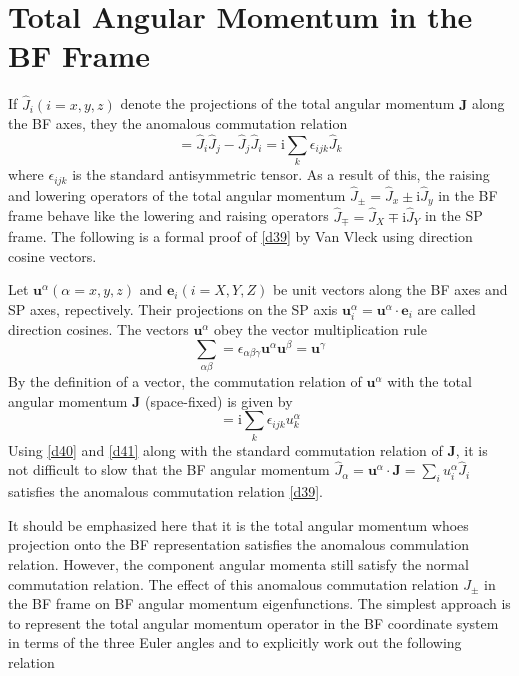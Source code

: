 \documentclass[]{article}
\begin{document}
\section{Total Angular Momentum in the BF Frame}
If $\hat{J}_i(i=x,y,z)$ denote the projections of the total angular momentum $\mathbf{J}$ along the BF axes, they the anomalous commutation relation
\begin{equation}
	[\hat{J}_i,\hat{J}_j]=\hat{J}_i\hat{J}_j-\hat{J}_j\hat{J}_i=\mathrm{i}\sum\limits_k\epsilon_{ijk}\hat{J}_k
	\label{d39}
\end{equation}
where $\epsilon_{ijk}$ is the standard antisymmetric tensor. As a result of this, the raising and lowering operators of the total angular momentum $\hat{J}_\pm=\hat{J}_x\pm\mathrm{i}\hat{J}_y$ in the BF frame behave like the lowering and raising operators $\hat{J}_\mp=\hat{J}_X\mp\mathrm{i}\hat{J}_Y$ in the SP frame. The following is a formal proof of \eqref{d39} by Van Vleck using direction cosine vectors.\par 
Let $\mathbf{u}^\alpha(\alpha=x,y,z)$ and $\mathbf{e}_i(i=X,Y,Z)$ be unit vectors along the BF axes and SP axes, repectively. Their projections on the SP axis $\mathbf{u}^\alpha_i=\mathbf{u}^\alpha\cdot\mathbf{e}_i$ are called direction cosines. The vectors $\mathbf{u}^\alpha$ obey the vector multiplication rule
\begin{equation}
	\sum\limits_{\alpha\beta}=\epsilon_{\alpha\beta\gamma}\mathbf{u}^\alpha\mathbf{u}^\beta=\mathbf{u}^\gamma 
	\label{d40}
\end{equation}
By the definition of a vector, the commutation relation of $\mathbf{u}^\alpha$ with the total angular momentum $\mathbf{J}$ (space-fixed) is given by
\begin{equation}
	[\hat{J}_i,u^\alpha_j] =\mathrm{i}\sum\limits_k\epsilon_{ijk}u^\alpha_k 
	\label{d41}
\end{equation}
Using \eqref{d40} and \eqref{d41} along with the standard commutation relation of $\mathbf{J}$, it is not difficult to slow that the BF angular momentum $\hat{J}_\alpha=\mathbf{u}^\alpha\cdot\mathbf{J}=\sum_iu^\alpha_i\hat{J}_i$ satisfies the anomalous commutation relation \eqref{d39}.\par 
It should be emphasized here that it is the total angular momentum whoes projection onto the BF representation satisfies the anomalous commulation relation. However, the component angular momenta still satisfy the normal commutation relation. The effect of this anomalous commutation relation $J_\pm$ in the BF frame on BF angular momentum eigenfunctions. The simplest approach is to represent the total angular momentum operator in the BF coordinate system in terms of the three Euler angles and to explicitly work out the following relation
\end{document}
